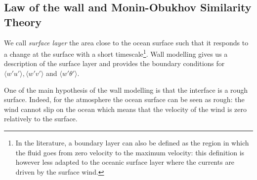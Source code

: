 \subsection{Law of the wall and Monin-Obukhov Similarity Theory}
\label{sec:airseaSCM_WallLaw}
We call \textit{surface layer} the area close to the ocean surface
such that it responds to a change at the surface with a short
timescale\footnote{In the literature, a boundary layer can also
be defined as the region in which the fluid goes from zero
velocity to the maximum velocity: this definition is however
less adapted to the oceanic surface layer where the currents
are driven by the surface wind.}.
Wall modelling gives us a description of the surface layer
and provides the boundary conditions for
$\langle w' u'\rangle, \langle w' v'\rangle$ and
$\langle w' \theta'\rangle$.
\par
One of the main hypothesis of the wall modelling is that
the interface is a rough surface.
Indeed, for the atmosphere the ocean surface can be seen as
rough: the wind cannot slip on the ocean which
means that the velocity of the wind is zero relatively
to the surface.
%
